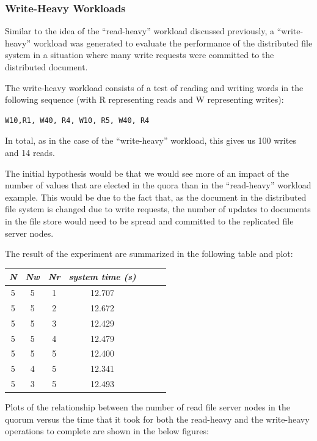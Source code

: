\documentclass
[english,a4paper]{article}
\begin{document}
\subsubsection{Write-Heavy Workloads}

Similar to the idea of the ``read-heavy'' workload discussed
previously, a ``write-heavy'' workload was generated to evaluate the
performance of the distributed file system in a situation where many
write requests were committed to the distributed document.

The write-heavy workload consists of a test of reading and writing
words in the following sequence (with R representing reads and W
representing writes): 

\begin{verbatim}
W10,R1, W40, R4, W10, R5, W40, R4
\end{verbatim} 

In total, as in the case of the ``write-heavy'' workload, this gives
us 100 writes and 14 reads. 

The initial hypothesis would be that we would see more of an impact of
the number of values that are elected in the quora than in the
``read-heavy'' workload example. This would be due to the fact that,
as the document in the distributed file system is changed due to write
requests, the number of updates to documents in the file store would
need to be spread and committed to the replicated file server nodes.

The result of the experiment
are summarized in the following table and plot:

\begin{center}
\begin{tabular}{| c | c | c | c | c | c | c}
\hline
\emph{N} & \emph{Nw} & \emph{Nr} & \emph{system time (s)}\\ \hline
5 &5 & 1 & 12.707 \\ \hline
5 &5 & 2 & 12.672 \\ \hline
5 &5 & 3 & 12.429 \\ \hline
5 &5 & 4 & 12.479 \\ \hline
5 &5 & 5 & 12.400  \\ \hline
5 &4 & 5 & 12.341  \\ \hline
5 &3 & 5 & 12.493 \\ \hline
\end{tabular}
\end{center}

Plots of the relationship between the number of read file server nodes
in the quorum versus the time that it took for both the read-heavy and
the write-heavy operations to complete are shown in the below figures:
\end{document}
